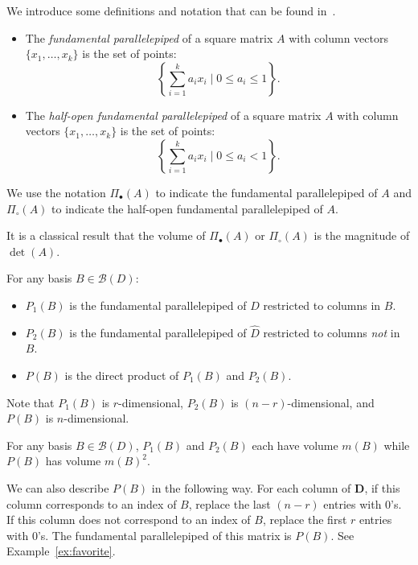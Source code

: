 \documentclass[ALCO,ThmDefs,Unicode,epreuves]{cedram}
\newcommand{\D}{\mathbf{D}}
\newcommand{\B}{\mathcal{B}}
\newcommand{\col}[1]{x_{#1}}
\begin{document}
We introduce some definitions and notation that can be found in~\cite{Beck}.
\begin{defi}\hfill\label{def:parpip}
\begin{itemize}
 \item The \emph{fundamental parallelepiped} of a square matrix $A$ with column vectors $\{\col 1,\dots,\col k\}$ is the set of points:
\[
 \left\{\sum_{i=1}^k a_i \col i \mid 0 \le a_i \le 1\right\}.
\]
 \item The \emph{half-open fundamental parallelepiped} of a square matrix $A$ with column vectors $\{\col 1,\dots,\col k\}$ is the set of points:
\[
 \left\{\sum_{i=1}^k a_i \col i \mid 0 \le a_i < 1\right\}.
\]
\end{itemize}
We use the notation $\Pi_{\bullet}(A)$ to indicate the fundamental parallelepiped of $A$ and 
$\Pi_{\circ}(A)$ to indicate the half-open fundamental parallelepiped of $A$. 
\end{defi}

It is a classical result that the volume of $\Pi_\bullet(A)$ or $\Pi_\circ(A)$ is the magnitude of $\det(A)$. 

\begin{defi} \label{def:p1p2p}
For any basis $B\in \B(D)$:
\begin{itemize}
 \item $P_1(B)$ is the fundamental parallelepiped of $D$ restricted to columns in $B$. 
 \item $P_2(B)$ is the fundamental parallelepiped of $\widehat D$ restricted to columns \emph{not} in $B$.
 \item $P(B)$ is the direct product of $P_1(B)$ and $P_2(B)$.
\end{itemize}
\end{defi}

Note that $P_1(B)$ is $r$-dimensional, $P_2(B)$ is $(n-r)$-dimensional, and $P(B)$ is $n$-dimensional. 

\begin{lemma}\label{lem:pipedvol}For any basis $B\in \mathcal B(D)$, $P_1(B)$ and $P_2(B)$ each have volume $m(B)$ while $P(B)$ has volume $m(B)^2$.
\end{lemma}

We can also describe $P(B)$ in the following way.
For each column of $\D$, if this column corresponds to an index of $B$, replace the last $(n-r)$ entries with 0's. If this column does not correspond to an index of $B$, replace the first $r$ entries with 0's. The fundamental parallelepiped of this matrix is $P(B)$. See Example~\ref{ex:favorite}. 
\end{document}
